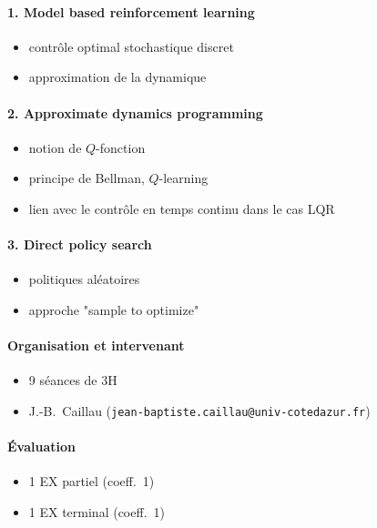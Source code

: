 \documentclass[11pt,a4paper]{article}
\theoremstyle{plain}
\theoremstyle{definition}
\begin{document}
\paragraph{1. Model based reinforcement learning} 
\begin{itemize}
  \item contr\^ole optimal stochastique discret
  \item approximation de la dynamique
\end{itemize}

\paragraph{2. Approximate dynamics programming} 
\begin{itemize}
  \item notion de $Q$-fonction
  \item principe de Bellman, $Q$-learning 
  \item lien avec le contr\^ole en temps continu dans le cas LQR
\end{itemize}

\paragraph{3. Direct policy search} 
\begin{itemize}
  \item politiques al\'eatoires
  \item approche "sample to optimize"
\end{itemize}

\paragraph{Organisation et intervenant}

\begin{itemize}
  \item 9 s\'eances de 3H
  \item J.-B.~Caillau (\verb+jean-baptiste.caillau@univ-cotedazur.fr+)
\end{itemize}

\paragraph{\'Evaluation}
\begin{itemize}
  \item 1 EX partiel (coeff.~1)
  \item 1 EX terminal (coeff.~1)
\end{itemize}
\end{document}
